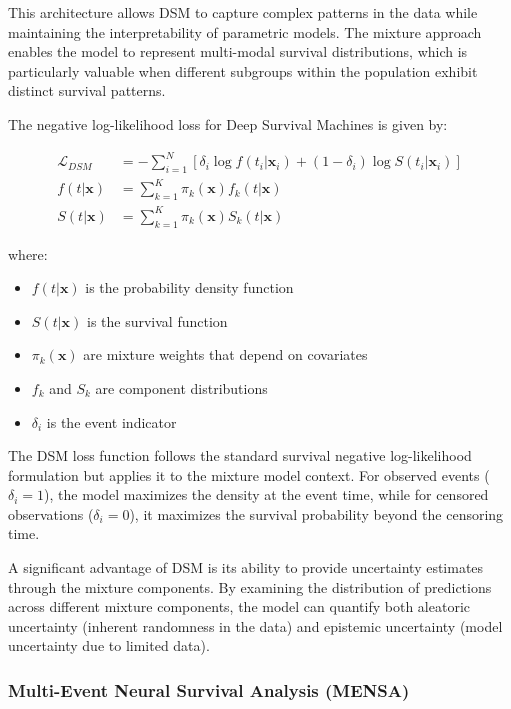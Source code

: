 This architecture allows DSM to capture complex patterns in the data while maintaining the interpretability of parametric models. The mixture approach enables the model to represent multi-modal survival distributions, which is particularly valuable when different subgroups within the population exhibit distinct survival patterns.

\begin{equationbox}[title=DSM Loss Function]
  The negative log-likelihood loss for Deep Survival Machines is given by:

  \begin{align}
    \mathcal{L}_{DSM} &= -\sum_{i=1}^N \left[ \delta_i \log f(t_i|\mathbf{x}_i) + (1-\delta_i) \log S(t_i|\mathbf{x}_i) \right] \\
    f(t|\mathbf{x}) &= \sum_{k=1}^K \pi_k(\mathbf{x}) f_k(t|\mathbf{x}) \\
    S(t|\mathbf{x}) &= \sum_{k=1}^K \pi_k(\mathbf{x}) S_k(t|\mathbf{x})
  \end{align}

  where:
  \begin{itemize}
  \item $f(t|\mathbf{x})$ is the probability density function
  \item $S(t|\mathbf{x})$ is the survival function
  \item $\pi_k(\mathbf{x})$ are mixture weights that depend on covariates
  \item $f_k$ and $S_k$ are component distributions
  \item $\delta_i$ is the event indicator
  \end{itemize}
\end{equationbox}

The DSM loss function follows the standard survival negative log-likelihood formulation but applies it to the mixture model context. For observed events ($\delta_i = 1$), the model maximizes the density at the event time, while for censored observations ($\delta_i = 0$), it maximizes the survival probability beyond the censoring time.

A significant advantage of DSM is its ability to provide uncertainty estimates through the mixture components. By examining the distribution of predictions across different mixture components, the model can quantify both aleatoric uncertainty (inherent randomness in the data) and epistemic uncertainty (model uncertainty due to limited data).

\subsubsection{Multi-Event Neural Survival Analysis (MENSA)}

